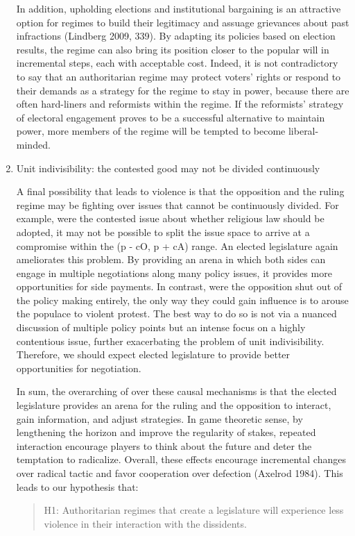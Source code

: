\begin{enumerate}
In addition, upholding elections and institutional bargaining is an attractive option for regimes to build their legitimacy and assuage grievances about past infractions (Lindberg 2009, 339). By adapting its policies based on election results, the regime can also bring its position closer to the popular will in incremental steps, each with acceptable cost. Indeed, it is not contradictory to say that an authoritarian regime may protect voters’ rights or respond to their demands as a strategy for the regime to stay in power, because there are often hard-liners and reformists within the regime. If the reformists’ strategy of electoral engagement proves to be a successful alternative to maintain power, more members of the regime will be tempted to become liberal-minded.

\item Unit indivisibility: the contested good may not be divided continuously

A final possibility that leads to violence is that the opposition and the ruling regime may be fighting over issues that cannot be continuously divided. For example, were the contested issue about whether religious law should be adopted, it may not be possible to split the issue space to arrive at a compromise within the (p - cO, p + cA) range. An elected legislature again ameliorates this problem. By providing an arena in which both sides can engage in multiple negotiations along many policy issues, it provides more opportunities for side payments. In contrast, were the opposition shut out of the policy making entirely, the only way they could gain influence is to arouse the populace to violent protest. The best way to do so is not via a nuanced discussion of multiple policy points but an intense focus on a highly contentious issue, further exacerbating the problem of unit indivisibility. Therefore, we should expect elected legislature to provide better opportunities for negotiation.

In sum, the overarching of over these causal mechanisms is that the elected legislature provides an arena for the ruling and the opposition to interact, gain information, and adjust strategies. In game theoretic sense, by lengthening the horizon and improve the regularity of stakes, repeated interaction encourage players to think about the future and deter the temptation to radicalize. Overall, these effects encourage incremental changes over radical tactic and favor cooperation over defection (Axelrod 1984). This leads to our hypothesis that:

\begin{quote}
H1: Authoritarian regimes that create a legislature will experience less violence in their interaction with the dissidents.
\end{quote}
\end{enumerate}

